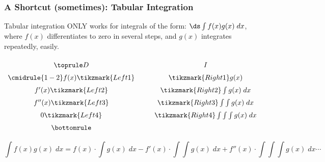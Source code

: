 \begin{frame}
\frametitle{A Shortcut (sometimes):  Tabular Integration
}
\begin{example} Tabular integration ONLY works for integrals of the form:
$ \ds \int f(x)g(x)\;dx $, where $ f(x) $ differentiates to zero in several steps, and $ g(x) $ integrates repeatedly, easily. 



\[\renewcommand{\arraystretch}{1.5}
\begin{array}{c @{\hspace*{1.0cm}} c}\toprule
   D & I \\\cmidrule{1-2}
  f(x)\tikzmark{Left 1} & \tikzmark{Right 1}g(x) \\
  f'(x) \tikzmark{Left 2} & \tikzmark{Right 2} \int g(x)\;dx \\
  f''(x)  \tikzmark{Left 3} & \tikzmark{Right 3}  \int \int g(x)\;dx \\
  0  \tikzmark{Left 4} & \tikzmark{Right 4}\int \int \int g(x)\;dx \\\bottomrule
\end{array}
\]

\small{
\[
\int f(x)g(x)\;dx = f(x)\cdot \int g(x)\;dx - f'(x)\cdot \int \int g(x)\; dx+f''(x)\cdot \int \int \int g(x)\; dx \cdots
\]
}
\end{example}
\end{frame}
